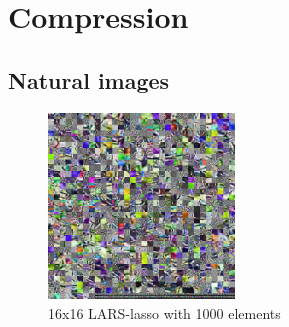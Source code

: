 \section{Compression}

\subsection{Natural images}


\begin{figure}[H]
\centering
\includegraphics[width = 0.44\textwidth]{images/16_1000_1000_10_lasso.png}
\caption{16x16 LARS-lasso with 1000 elements}
\label{fig:16_1000_lasso}
\end{figure}

